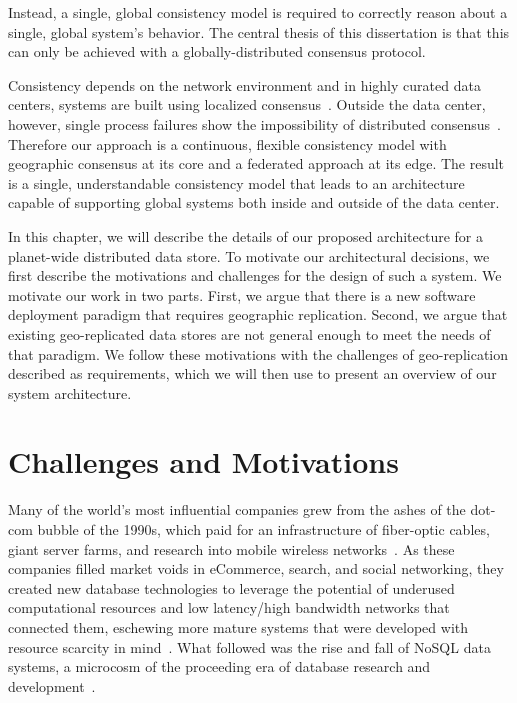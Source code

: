 Instead, a single, global consistency model is required to correctly reason about a single, global system's behavior.
The central thesis of this dissertation is that this can only be achieved with a globally-distributed consensus protocol.

Consistency depends on the network environment and in highly curated data centers, systems are built using localized consensus~\cite{bolosky_paxos_2011}.
Outside the data center, however, single process failures show the impossibility of distributed consensus~\cite{fischer_impossibility_1985}.
Therefore our approach is a continuous, flexible consistency model with geographic consensus at its core and a federated approach at its edge.
The result is a single, understandable consistency model that leads to an architecture capable of supporting global systems both inside and outside of the data center.

In this chapter, we will describe the details of our proposed architecture for a planet-wide distributed data store.
To motivate our architectural decisions, we first describe the motivations and challenges for the design of such a system.
We motivate our work in two parts.
First, we argue that there is a new software deployment paradigm that requires geographic replication.
Second, we argue that existing geo-replicated data stores are not general enough to meet the needs of that paradigm.
We follow these motivations with the challenges of geo-replication described as requirements, which we will then use to present an overview of our system architecture.

\section{Challenges and Motivations}
\label{ch02_challenges_and_motivations}

Many of the world's most influential companies grew from the ashes of the dot-com bubble of the 1990s, which paid for an infrastructure of fiber-optic cables, giant server farms, and research into mobile wireless networks~\cite{casey_blockchain_2018}.
As these companies filled market voids in eCommerce, search, and social networking, they created new database technologies to leverage the potential of underused computational resources and low latency/high bandwidth networks that connected them, eschewing more mature systems that were developed with resource scarcity in mind~\cite{stonebraker_what_2005,stonebraker_mapreduce_2010}.
What followed was the rise and fall of NoSQL data systems, a microcosm of the proceeding era of database research and development~\cite{mohan_history_2013}.

